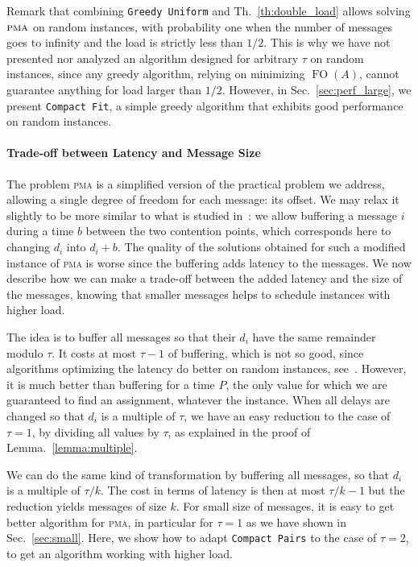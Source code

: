 \documentclass[a4paper,UKenglish,cleveref, autoref, thm-restate]{lipics-v2019}
\DeclareMathOperator{\Fo}{FO}
\newcommand\pma{\textsc{pma}\xspace}
\newcommand\compactpair{\texttt{Compact Pairs}\xspace}
\newcommand\greedyuniform{\texttt{Greedy Uniform}\xspace}
\newcommand\compactfit{\texttt{Compact Fit}\xspace}
\begin{document}
Remark that combining \greedyuniform and Th.~\ref{th:double_load} allows solving $\pma$ on random instances, with probability one when the number of messages goes to infinity and the load is strictly less than $1/2$. This is why we have not presented nor analyzed an algorithm designed for arbitrary $\tau$ on random instances, since any greedy algorithm, relying on minimizing $\Fo(A)$, cannot guarantee anything for load larger than $1/2$. However, in Sec.~\ref{sec:perf_large}, we present \compactfit, a simple greedy algorithm that exhibits good performance on random instances.

\paragraph*{Trade-off between Latency and Message Size}

The problem \pma is a simplified version of the practical problem we address, allowing a single degree of freedom for each message: its offset. We may relax it slightly to be more similar to what is studied in~\cite{barth2018deterministic}: we allow buffering a message $i$ during a time $b$ between the two contention points, which corresponds here to changing $d_i$ into $d_i + b$. The quality of the solutions obtained for such a modified instance of \pma is worse since the buffering adds latency to the messages. We now describe how we can make a trade-off between the added latency and the size of the messages, knowing that smaller messages helps to schedule instances with higher load.

The idea is to buffer all messages so that their $d_i$ have the same
remainder modulo $\tau$. It costs at most $\tau - 1$ of buffering, which is not
so good, since algorithms optimizing the latency do better on random instances, see~\cite{barth2018deterministic}. However, it is much better than buffering for a time $P$, the only value for which we are guaranteed to find an assignment, whatever the instance. When all delays are changed so that $d_i$ is a multiple of $\tau$, we have an easy reduction to the case of $\tau = 1$, by dividing all values by $\tau$, as explained in the proof of Lemma.~\ref{lemma:multiple}.


We can do the same kind of transformation by buffering all messages, so that $d_i$ is a multiple of $\tau / k$. The cost in terms of latency is then at most $\tau / k - 1$ but the reduction yields messages of size $k$. For small size of messages, it is easy to get better algorithm for \pma, in particular for $\tau = 1$ as we have shown in Sec.~\ref{sec:small}. Here, we show how to adapt \compactpair to the case of $\tau = 2$, to get an algorithm working with higher load.
\end{document}
